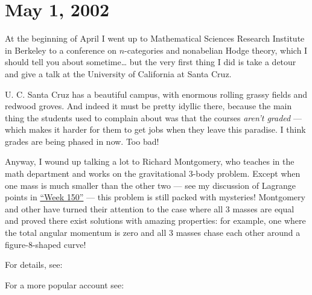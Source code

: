\documentclass{article}
\def\tightlist{}
\renewcommand{\texttt}[1]{%
  \begingroup
  \ttfamily
  \begingroup\lccode`~=`/\lowercase{\endgroup\def~}{/\discretionary{}{}{}}%
  \begingroup\lccode`~=`[\lowercase{\endgroup\def~}{[\discretionary{}{}{}}%
  \begingroup\lccode`~=`.\lowercase{\endgroup\def~}{.\discretionary{}{}{}}%
  \catcode`/=\active\catcode`[=\active\catcode`.=\active
  \scantokens{#1\noexpand}%
  \endgroup
}
\begin{document}
\hypertarget{week181}{%
\section{May 1, 2002}\label{week181}}

At the beginning of April I went up to Mathematical Sciences Research
Institute in Berkeley to a conference on \(n\)-categories and nonabelian
Hodge theory, which I should tell you about sometime\ldots{} but the
very first thing I did is take a detour and give a talk at the
University of California at Santa Cruz.

U. C. Santa Cruz has a beautiful campus, with enormous rolling grassy
fields and redwood groves. And indeed it must be pretty idyllic there,
because the main thing the students used to complain about was that the
courses \emph{aren't graded} --- which makes it harder for them to get
jobs when they leave this paradise. I think grades are being phased in
now. Too bad!

Anyway, I wound up talking a lot to Richard Montgomery, who teaches in
the math department and works on the gravitational 3-body problem.
Except when one mass is much smaller than the other two --- see my
discussion of Lagrange points in \protect\hyperlink{week150}{``Week
150''} --- this problem is still packed with mysteries! Montgomery and
other have turned their attention to the case where all 3 masses are
equal and proved there exist solutions with amazing properties: for
example, one where the total angular momentum is zero and all 3 masses
chase each other around a figure-8-shaped curve!

For details, see:


For a more popular account see:

\end{document}
